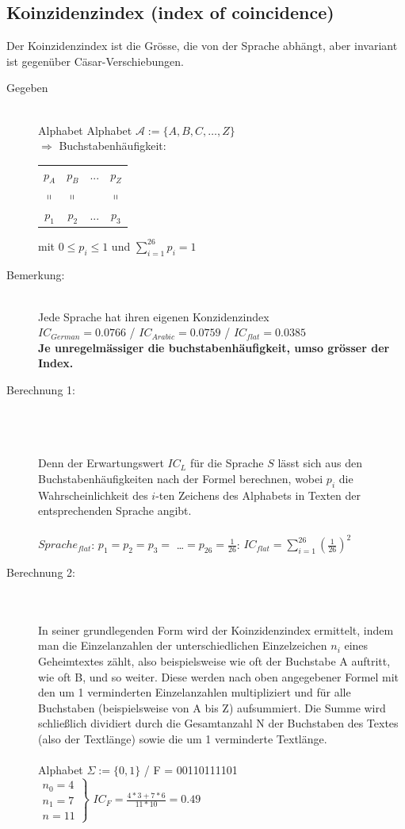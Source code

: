 \documentclass[10pt]{article}
\newcommand{\Pota}{\mathcal{A}}
\newcommand{\Ra}{\Rightarrow}
\newcommand{\Brackar}[2]{\left.\begin{array}{#1} #2 \end{array}\right\rbrace} %
\begin{document}
\subsection{Koinzidenzindex (index of coincidence)}
Der Koinzidenzindex ist die Grösse, die von der Sprache abhängt, aber invariant ist gegenüber Cäsar-Verschiebungen.
\begin{description}
	\item[Gegeben] \hfill \\
		Alphabet Alphabet $\Pota:=\{A,B,C,\dots,Z\}$\\ 
		$\Ra$ Buchstabenhäufigkeit: 
		\begin{tabular}{c c c c}
			$p_A$ & $p_B$ & ... & $p_Z$ \\
			$\shortparallel$ & $\shortparallel$ & & $\shortparallel$ \\
			$p_1$ & $p_2$ & ... & $p_3$ \\
		\end{tabular} 
		mit $0\leq p_i \leq 1$ und $\sum_{i=1}^{26} p_i=1$
	\item[Bemerkung:] \hfill \\
		Jede Sprache hat ihren eigenen Konzidenzindex \\
		$IC_{German}=0.0766$ / $IC_{Arabic}=0.0759$ / $IC_{flat}=0.0385$ \\
		\textbf{Je unregelmässiger die buchstabenhäufigkeit, umso grösser der Index.}
	\item[Berechnung 1:] \hfill \\
		  \\ \\
		Denn der Erwartungswert $IC_L$ für die Sprache $S$ lässt sich aus den Buchstabenhäufigkeiten nach der Formel  berechnen, wobei $p_i$ die Wahrscheinlichkeit des $i$-ten Zeichens des Alphabets in Texten der entsprechenden Sprache angibt. \\
		\\
		$Sprache_{flat}$: $p_1=p_2=p_3=$ \dots $=p_{26}=\frac{1}{26}$: $IC_{flat}=\sum^{26}_{i=1}(\frac{1}{26})^2$
	\item[Berechnung 2:] \hfill \\
		 \\
		In seiner grundlegenden Form wird der Koinzidenzindex ermittelt, indem man die Einzelanzahlen  der unterschiedlichen Einzelzeichen $n_i$ eines Geheimtextes zählt, also beispielsweise wie oft der Buchstabe A auftritt, wie oft B, und so weiter. Diese werden nach oben angegebener Formel mit den um 1 verminderten Einzelanzahlen multipliziert und für alle Buchstaben (beispielsweise von A bis Z) aufsummiert. Die Summe wird schließlich dividiert durch die Gesamtanzahl N der Buchstaben des Textes (also der Textlänge) sowie die um 1 verminderte Textlänge. \\
	\\
	Alphabet $\Sigma := \{0,1\}$ / F = 00110111101 \\
	$\Brackar{l}{n_0=4 \\ n_1=7 \\ \hline n=11 }$ $IC_F=\frac{4*3+7*6}{11*10}=0.49$ \\
	

\end{description}
\end{document}
